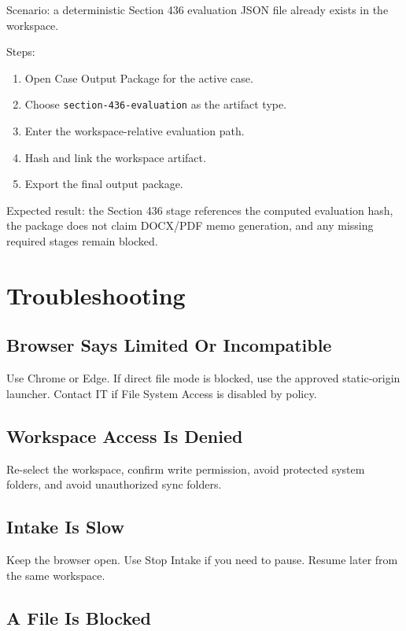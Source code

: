 Scenario: a deterministic Section 436 evaluation JSON file already exists in the workspace.

Steps:

\begin{enumerate}
  \item Open Case Output Package for the active case.
  \item Choose \texttt{section-436-evaluation} as the artifact type.
  \item Enter the workspace-relative evaluation path.
  \item Hash and link the workspace artifact.
  \item Export the final output package.
\end{enumerate}

Expected result: the Section 436 stage references the computed evaluation hash, the package does not claim DOCX/PDF memo generation, and any missing required stages remain blocked.

\chapter{Troubleshooting}

\section{Browser Says Limited Or Incompatible}

Use Chrome or Edge. If direct file mode is blocked, use the approved static-origin launcher. Contact IT if File System Access is disabled by policy.

\section{Workspace Access Is Denied}

Re-select the workspace, confirm write permission, avoid protected system folders, and avoid unauthorized sync folders.

\section{Intake Is Slow}

Keep the browser open. Use Stop Intake if you need to pause. Resume later from the same workspace.

\section{A File Is Blocked}

